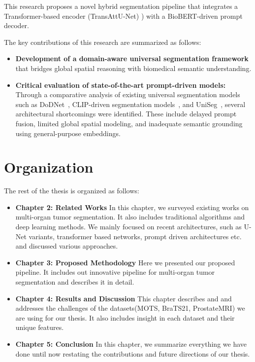 \documentclass{cls/iutbscthesis}
\begin{document}
This research proposes a novel hybrid segmentation pipeline that integrates a Transformer-based encoder (TransAttU-Net) \cite{chen2024transattunet}) with a BioBERT-driven prompt decoder.
\par
The key contributions of this research are summarized as follows:
\begin{itemize}
    \item \textbf{Development of a domain-aware universal segmentation framework} that bridges global spatial reasoning with biomedical semantic understanding.
    
    \item \textbf{Critical evaluation of state-of-the-art prompt-driven models:} Through a comparative analysis of existing universal segmentation models such as DoDNet~\cite{zhang2021dodnet}, CLIP-driven segmentation models~\cite{liu2023clip}, and UniSeg~\cite{ye2023uniseg}, several architectural shortcomings were identified. These include delayed prompt fusion, limited global spatial modeling, and inadequate semantic grounding using general-purpose embeddings.
\end{itemize}


\section{Organization}
The rest of the thesis is organized as follows:
\begin{itemize}
    \item \textbf{Chapter 2: Related Works} In this chapter, we surveyed existing works on multi-organ tumor segmentation. It also includes traditional algorithms and deep learning methods. We mainly focused on recent architectures, such as U-Net variants, transformer based networks, prompt driven architectures etc. and discussed various approaches.
    
    \item \textbf{Chapter 3: Proposed Methodology} Here we presented our proposed pipeline. It includes out innovative pipeline for multi-organ tumor segmentation and describes it in detail.
    
    \item \textbf{Chapter 4: Results and Discussion} This chapter describes and and addresses the challenges of the datasets(MOTS, BraTS21, ProstateMRI) we are using for our thesis. It also includes insight in each dataset and their unique features.
    
    \item \textbf{Chapter 5: Conclusion} In this chapter, we summarize everything we have done until now restating the contributions and future directions of our thesis.
\end{itemize}
\end{document}
